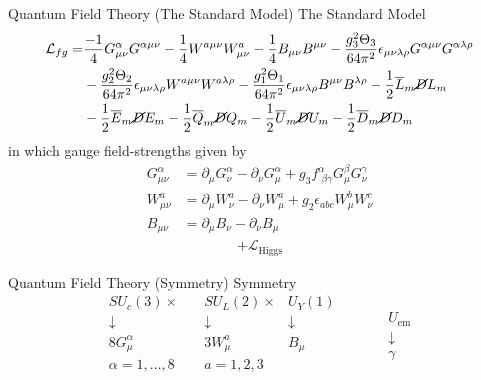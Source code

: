 \documentclass{beamer}
\begin{document}
	\begin{frame}{Quantum Field Theory (The Standard Model)}
	The Standard Model
		\begin{equation*}
			\begin{aligned}
				\mathcal{L}_{fg} = & \frac{-1}{4} G^{\alpha}_{\mu \nu} G^{\alpha \mu \nu} - \frac{1}{4} W^{a\mu \nu} W^{a}_{\mu \nu} - \frac{1}{4} B_{\mu \nu} B^{\mu \nu} - \frac{g_3^2 \Theta_3}{64\pi^2} \epsilon_{\mu \nu \lambda \rho} G^{\alpha \mu \nu} G^{\alpha \lambda \rho} \\
& - \frac{g_2^2 \Theta_2}{64 \pi^2} \epsilon_{\mu \nu \lambda \rho} W^{a \mu \nu} W^{a\lambda \rho } - \frac{g_1^2 \Theta_1}{64 \pi^2 } \epsilon_{\mu \nu \lambda \rho} B^{\mu \nu} B^{\lambda \rho} - \frac{1}{2} \overline{L}_m \cancel{D} L_m \\ 
& - \frac{1}{2} \overline{E}_m \cancel{D} E_m - \frac{1}{2} \overline{Q}_m \cancel{D} Q_m - \frac{1}{2} \overline{U}_m \cancel{D} U_m - \frac{1}{2} \overline{D}_m \cancel{D} D_m
			\end{aligned}
		\end{equation*}
in which gauge field-strengths given by
\[
\begin{aligned}
G^{\alpha}_{\mu \nu} & = \partial_{\mu} G_{\nu}^{\alpha} - \partial_{\nu} G_{\mu}^{\alpha} + g_3 f^{\alpha}_{\, \, \beta \gamma} G_{\mu}^{\beta} G_{\nu}^{\gamma} \\
W^a_{\mu \nu} & = \partial_{\mu} W_{\nu}^a - \partial_{\nu} W^a_{\mu} + g_2 \epsilon_{abc} W^b_{\mu} W^c_{\nu} \\
B_{\mu \nu} & = \partial_{\mu} B_{\nu} - \partial_{\nu} B_{\mu}
\end{aligned}
\]
\[
\begin{gathered}
 + \mathcal{L}_{\text{Higgs}}
\end{gathered}
\]
	\end{frame}
\begin{frame}{Quantum Field Theory (Symmetry)}
		Symmetry
		\begin{equation*}
			\begin{aligned}
				 SU_c(3) \times \quad & SU_L(2)  \times & U_Y(1) \\
				 \downarrow \quad & \downarrow & \downarrow \\
				 8 G_{\mu}^{\alpha} \quad & 3 W_{\mu}^a & B_{\mu} \\
				 \alpha = 1, \dots, 8 \quad & a = 1, 2, 3 & \\
			\end{aligned} \quad \quad \, \begin{aligned}
& U_{\text{em}} \\ 
& \downarrow \\
& \gamma
\end{aligned}
		\end{equation*}

\end{frame}
\end{document}
